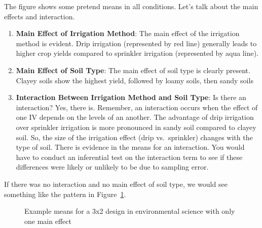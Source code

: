 \documentclass[
  letterpaper,
  DIV=11,
  numbers=noendperiod]{scrreprt}
\begin{document}
The figure shows some pretend means in all conditions. Let's talk about
the main effects and interaction.

\begin{enumerate}
\def\labelenumi{\arabic{enumi}.}
\item
  \textbf{Main Effect of Irrigation Method}: The main effect of the
  irrigation method is evident. Drip irrigation (represented by red
  line) generally leads to higher crop yields compared to sprinkler
  irrigation (represented by aqua line).
\item
  \textbf{Main Effect of Soil Type}: The main effect of soil type is
  clearly present. Clayey soils show the highest yield, followed by
  loamy soils, then sandy soils
\item
  \textbf{Interaction Between Irrigation Method and Soil Type}: Is there
  an interaction? Yes, there is. Remember, an interaction occurs when
  the effect of one IV depends on the levels of an another. The
  advantage of drip irrigation over sprinkler irrigation is more
  pronounced in sandy soil compared to clayey soil. So, the size of the
  irrigation effect (drip vs.~sprinkler) changes with the type of soil.
  There is evidence in the means for an interaction. You would have to
  conduct an inferential test on the interaction term to see if these
  differences were likely or unlikely to be due to sampling error.
\end{enumerate}

If there was no interaction and no main effect of soil type, we would
see something like the pattern in Figure~\ref{fig-1123one}.

\begin{figure}


\caption{\label{fig-1123one}Example means for a 3x2 design in
environmental science with only one main effect}

\end{figure}%
\end{document}
